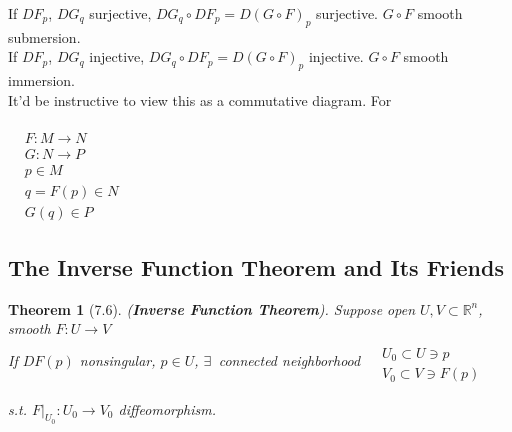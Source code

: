 \documentclass[11pt]{amsart}
\newtheorem{theorem}{Theorem}
\theoremstyle{definition}
\begin{document}
If $DF_p$, $DG_q$ surjective, $DG_q\circ DF_p = D(G\circ F)_p$ surjective.  $G\circ F$ smooth submersion.  \\
If $DF_p$, $DG_q$ injective, $DG_q\circ DF_p = D(G\circ F)_p$ injective.  $G\circ F$ smooth immersion.   \\

It'd be instructive to view this as a commutative diagram.  For

$\begin{aligned} & \quad \\
                 & F: M \to N \\
                 & G : N \to P \\
                 & p \in M \\
                 & q = F(p) \in N \\
                 & G(q) \in P \end{aligned}$ 




\subsection*{ The Inverse Function Theorem and Its Friends }

\begin{theorem}[7.6] (\textbf{Inverse Function Theorem}). Suppose open $U,V \subset \mathbb{R}^n$, smooth $F: U \to V$ \\
If $DF(p)$ nonsingular, $p \in U$, $\exists \, $ connected neighborhood $\begin{aligned} & \quad \\ & U_0 \subset U \ni p \\ & V_0 \subset V \ni F(p) \end{aligned}$

s.t. $\left. F \right|_{U_0} : U_0 \to V_0$ diffeomorphism.
\end{theorem}
\end{document}
